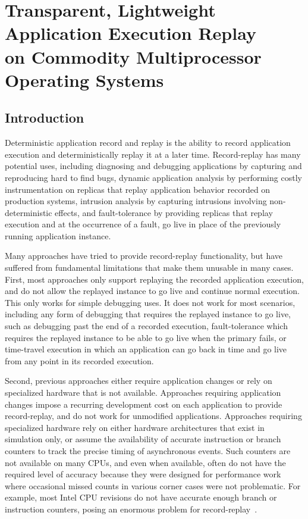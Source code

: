 \chapter{Transparent, Lightweight Application Execution Replay \\
on Commodity Multiprocessor Operating Systems}
\label{ch:scribe}

\section{Introduction}

Deterministic application record and replay is the ability to record
application execution and deterministically replay it at a later time.
Record-replay has many potential uses, including diagnosing
and debugging applications by capturing and reproducing hard to find
bugs, dynamic application analysis by performing costly
instrumentation on replicas that replay application behavior recorded
on production systems, intrusion analysis by capturing intrusions involving
non-deterministic effects, and fault-tolerance by providing
replicas that replay execution and at the occurrence of a fault, go
live in place of the previously running application instance.  

Many approaches have tried to provide record-replay functionality, but
have suffered from fundamental limitations that make them 
unusable in many cases.  First, most approaches only
support replaying the recorded application execution, and do not allow
the replayed instance to go live and continue normal execution.  This
only works for simple debugging uses.  It does not work for most
scenarios, including any form of debugging that requires the 
replayed instance to go live, such as debugging past the end of a
recorded execution, fault-tolerance which requires the replayed
instance to be able to go live when the primary fails, or time-travel
execution in which an application can go back in time and go live
from any point in its recorded execution.  

Second, previous approaches either require application changes or rely
on specialized hardware that is not available.  Approaches requiring
application changes impose a recurring development cost on each
application to provide record-replay, and do not work for unmodified
applications.  Approaches requiring specialized hardware rely on
either hardware architectures that exist in simulation only, or assume
the availability of accurate instruction or branch counters to track
the precise timing of asynchronous events.  Such counters are not
available on many CPUs, and even when available, often do not have the
required level of accuracy because they were designed for performance
work where occasional missed counts in various corner cases were not
problematic.  For example, most Intel CPU revisions do not have
accurate enough branch or instruction counters, posing an enormous
problem for record-replay~\cite{andytucker}.   

